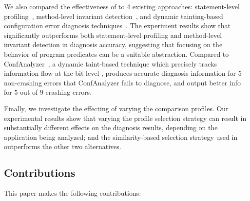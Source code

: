 We also compared the effectiveness of \ourtool to
4 existing approaches: statement-level profiling~\cite{Jones:2002}, method-level
invariant detection~\cite{Ernst:1999}, and dynamic tainting-based configuration
error diagnosis techniques~\cite{Rabkin:2011:PPC}. The experiment results show that
\ourtool significantly outperforms both statement-level profiling
and method-level invariant detection in diagnosis accuracy, suggesting
that focusing on the behavior of program predicates can be a
suitable abstraction. Compared to ConfAnalyzer~\cite{}, a dynamic taint-based technique
which precisely tracks information flow at the bit level , \ourtool
produces accurate diagnosis information for 5 non-crashing errors that
ConfAnalyzer fails to diagnose, and output better info for 5 out of 9
crashing errors. 

Finally, we investigate the effecting of varying the comparison profiles.
Our experimental results show that varying the
profile selection strategy can result in substantially different effects on the
diagnosis results, depending on the application being analyzed;
and the similarity-based selection strategy used in \ourtool outperforms
the other two alternatives.







\subsection{Contributions}
This paper makes the following contributions:

